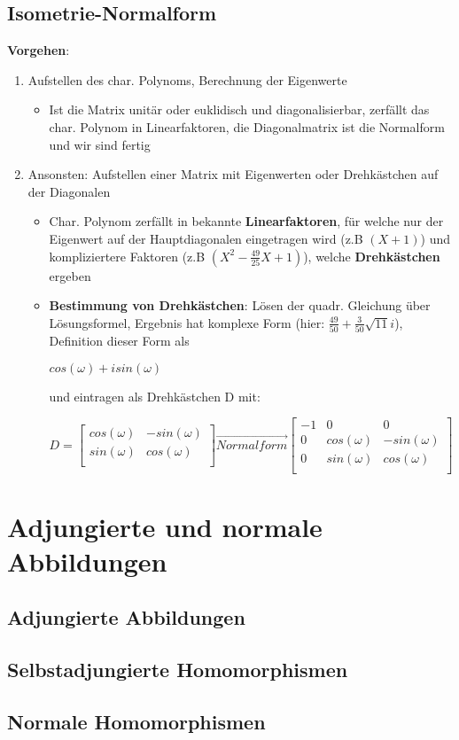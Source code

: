 \documentclass[10pt,a4paper]{article}
\begin{document}
	\subsection{Isometrie-Normalform}
	\textbf{Vorgehen}:
	\begin{enumerate}
		\item Aufstellen des char. Polynoms, Berechnung der Eigenwerte
		\begin{itemize}
			\item Ist die Matrix unitär oder euklidisch und diagonalisierbar, zerfällt das char. Polynom in Linearfaktoren, die Diagonalmatrix ist die Normalform und wir sind fertig
		\end{itemize}
		\item Ansonsten: Aufstellen einer Matrix mit Eigenwerten oder Drehkästchen auf der Diagonalen
		\begin{itemize}
			\item Char. Polynom zerfällt in bekannte \textbf{Linearfaktoren}, für welche nur der Eigenwert auf der Hauptdiagonalen eingetragen wird (z.B $(X + 1)$) und kompliziertere Faktoren (z.B $(X^2 - \frac{49}{25}X + 1)$), welche \textbf{Drehkästchen} ergeben
			\item \textbf{Bestimmung von Drehkästchen}: Lösen der quadr. Gleichung über Lösungsformel, Ergebnis hat komplexe Form (hier: $\frac{49}{50} + \frac{3}{50}\sqrt{11}i$), Definition dieser Form als
			\begin{center}
				$cos(\omega) + isin(\omega)$
			\end{center}
			und eintragen als Drehkästchen D mit:
			\begin{center}
				$D = \begin{bmatrix}
					cos(\omega) & -sin(\omega)\\
					sin(\omega) & cos(\omega)\\
				\end{bmatrix}
				\overrightarrow{Normalform} \begin{bmatrix}
					-1 & 0 & 0 \\
					0 & cos(\omega) & -sin(\omega)\\
					0 & sin(\omega) & cos(\omega)\\
				\end{bmatrix}$
			\end{center}
		\end{itemize}

	\end{enumerate}
	
	\section{Adjungierte und normale Abbildungen}
	\subsection{Adjungierte Abbildungen}
	\subsection{Selbstadjungierte Homomorphismen}
	\subsection{Normale Homomorphismen}
\end{document}
